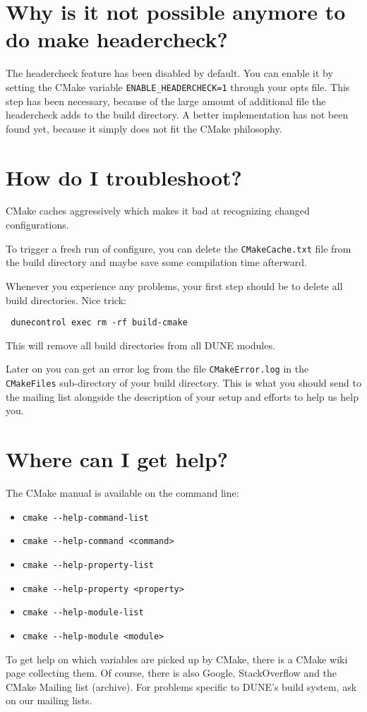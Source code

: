 \documentclass[a4paper,10pt,DIV9,headings=small]{scrartcl}
\begin{document}
\section{Why is it not possible anymore to do make headercheck?}
\label{headercheck}
The headercheck feature has been disabled by default. You can enable it by setting the CMake variable \lstinline!ENABLE_HEADERCHECK=1! through your opts file. This step has been necessary, because of the large amount of additional file the headercheck adds to the build directory. A better implementation has not been found yet, because it simply does not fit the CMake philosophy.

\section{How do I troubleshoot?}
\label{troubleshoot}
CMake caches aggressively which makes it bad at recognizing changed configurations.

To trigger a fresh run of configure, you can delete the \lstinline!CMakeCache.txt! file from
the build directory and maybe save some compilation time afterward.

Whenever
you experience any problems, your first step should be to delete all build directories. Nice trick:
\begin{lstlisting}
 dunecontrol exec rm -rf build-cmake
\end{lstlisting}
This will remove all build directories from all DUNE modules.

Later on you can get an error log from the file \lstinline!CMakeError.log! in the \lstinline!CMakeFiles!
sub-directory of your build directory. This is what you should send to the mailing list alongside the
description of your setup and efforts to help us help you.

\section{Where can I get help?}
\label{help}

The CMake manual is available on the command line:
 \begin{itemize}
  \item \verb!cmake --help-command-list!
  \item \verb!cmake --help-command <command>!
  \item \verb!cmake --help-property-list!
  \item \verb!cmake --help-property <property>!
  \item \verb!cmake --help-module-list!
  \item \verb!cmake --help-module <module>!
 \end{itemize}

To get help on which variables are picked up by CMake, there is a CMake wiki page collecting them.
Of course, there is also Google, StackOverflow and the CMake Mailing list (archive).
For problems specific to DUNE's build system, ask on our mailing lists.
\end{document}
